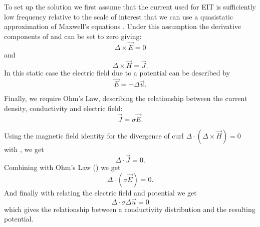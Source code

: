 To set up the solution we first assume that the current used for EIT is sufficiently low 
frequency relative to the scale of interest that we can use a 
quasistatic approximation of Maxwell's equations \parencite{larsson_electromagnetics_2007}. 
Under this assumption the derivative components of  and 
can be set to zero giving:
\begin{equation}
\Delta \times \vec{E} = 0
\end{equation}
and
\begin{equation} \label{eq:amp2}
\Delta \times \vec{H} = \vec{J}.
\end{equation}
In this static case the electric field due to a potential can be described by 
\begin{equation} \label{eq:field}
	\vec{E} = -\Delta\vec{u}.
\end{equation}

Finally, we require Ohm's Law, describing the relationship between the current density,
conductivity and electric field:
\begin{equation} \label{eq:ohm}
	\vec{J} = \sigma \vec{E}.
\end{equation}

Using the magnetic field identity for the divergence of curl 
$ \Delta \cdot (\Delta \times \vec{H}) = 0 $ with , we get
\begin{equation} \label{eq:mid1}
	\Delta \cdot \vec{J} = 0.
\end{equation}
Combining  with Ohm's Law () we get 
\begin{equation} \label{eq:mid2}
	\Delta \cdot (\sigma \vec{E}) = 0.
\end{equation}
And finally with  relating the electric field and potential 
we get 
\begin{equation}
	\Delta \cdot \sigma \Delta \vec{u} = 0
\end{equation}
which gives the relationship between a conductivity distribution and the resulting 
potential. 


